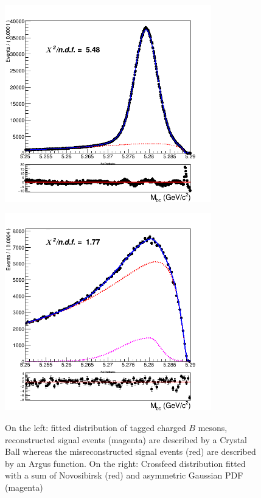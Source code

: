 \begin{figure}[H]
\begin{minipage}{.5\textwidth}
\centering
\subcaptionbox{\label{fig:stream0_anticorr_chargedBtag_Total_Signal_fit}}
{\includegraphics[width=0.80\textwidth]{06-chargedAnticorrBtoLambda/figs/stream0_anticorr_chargedBtag_Total_Signal_fit.png}}
\end{minipage} 
 \begin{minipage}{.5\textwidth}
\subcaptionbox{\label{fig:NeutralCrossfeed_stream0_anticorrLambdaC_chargedBtag_MbcFit}}
{\includegraphics[width=0.80\textwidth]{06-chargedAnticorrBtoLambda/figs/NeutralCrossfeed_stream0_anticorrLambdaC_chargedBtag_MbcFit.png}}
\end{minipage}
\caption{On the left: fitted distribution of tagged charged $B$ mesons, reconstructed signal events (magenta) are described by a Crystal Ball whereas the misreconstructed signal events (red) are described by an Argus function. On the right: Crossfeed distribution fitted with a sum of Novosibirsk (red) and asymmetric Gaussian PDF (magenta)}
\end{figure}


